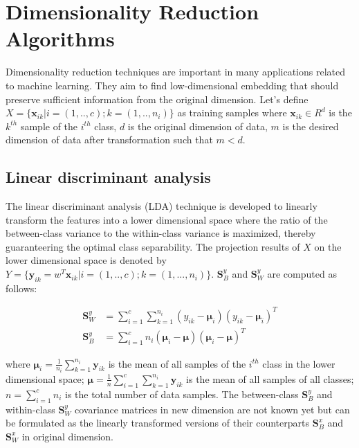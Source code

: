 
\section{Dimensionality Reduction Algorithms}
    Dimensionality reduction techniques are important in many applications related to machine learning.
    They aim to find low-dimensional embedding that should preserve sufficient information from the original dimension.
    Let's define $X = \{\boldsymbol{x}_{ik}|i=(1,..,c);k=(1,..,n_{i})\}$ as training samples where $\boldsymbol{x}_{ik} \in R^{d}$ is the $k^{th}$ sample of the $i^{th}$ class, $d$ is the original dimension of data, $m$ is the desired dimension of data after transformation such that $m < d$.

    \subsection{Linear discriminant analysis}
        The linear discriminant analysis (LDA) technique is developed to linearly transform the features into a lower dimensional space where the ratio of the between-class variance to the within-class variance is maximized, thereby guaranteering the optimal class separability.
        The projection results of $X$ on the lower dimensional space is denoted by $Y = \{\boldsymbol{y}_{ik} = w^T\boldsymbol{x}_{ik}|i=(1,..,c); k=(1,...,n_{i})\}$. $\boldsymbol{S}_B^y$ and $\boldsymbol{S}_W^y$ are computed as follows: 

        \begin{align}
            \boldsymbol{S}_W^y &= \sum_{i=1}^{c}\sum_{k=1}^{n_{i}}(y_{ik}-\boldsymbol{\mu}_i)(y_{ik}-\boldsymbol{\mu}_i)^T \label{eq:LDA_Sw_y}\\
            \boldsymbol{S}_B^y &= \sum_{i=1}^{c}n_i(\boldsymbol{\mu}_i - \boldsymbol{\mu})(\boldsymbol{\mu}_i - \boldsymbol{\mu})^T \label{eq:LDA_Sb_y}
        \end{align}

        where $\boldsymbol{\mu}_i=\frac{1}{n_i}{\sum_{k=1}^{n_{i}}}{\boldsymbol{y}_{ik}}$ is the mean of all samples of the $i^{th}$ class in the lower dimensional space; $\boldsymbol{\mu}=\frac{1}{n}\sum_{i=1}^{c}{\sum_{k=1}^{n_{i}}{\boldsymbol{y}_{ik}}}$ is the mean of all samples of all classes; $n=\sum_{i=1}^{c}n_i$ is the total number of data samples.
        The between-class $\boldsymbol{S}_B^y$ and within-class $\boldsymbol{S}_W^y$ covariance matrices in new dimension are not known yet but can be formulated as the linearly transformed versions of their counterparts $\boldsymbol{S}_B^x$ and $\boldsymbol{S}_W^x$ in original dimension.

